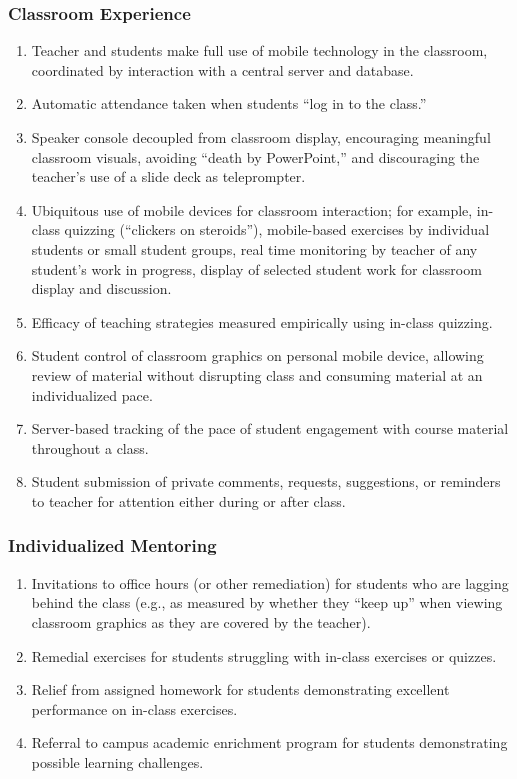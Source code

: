 \documentclass{article}
\begin{document}
\subsubsection{Classroom Experience}
\begin{enumerate}
\item Teacher and students make full use of mobile technology in the classroom,
  coordinated by interaction with a central server and database.
\item Automatic attendance taken when students ``log in to the class.''
\item Speaker console decoupled from classroom display,
  encouraging meaningful classroom visuals,
  avoiding ``death by PowerPoint,'' and
  discouraging the teacher's use of a slide deck as teleprompter.
\item Ubiquitous use of mobile devices for classroom interaction; for example,
  in-class quizzing (``clickers on steroids''),
  mobile-based exercises by individual students or small student groups,
  real time monitoring by teacher of any student's work in progress,
  display of selected student work for classroom display and discussion.
\item Efficacy of teaching strategies measured empirically using in-class quizzing.
\item Student control of classroom graphics on personal mobile device,
  allowing review of material without disrupting class and
  consuming material at an individualized pace.
\item Server-based tracking of the pace of student engagement with course material
  throughout a class.
\item Student submission of private comments, requests, suggestions, or reminders to
  teacher for attention either during or after class.
\end{enumerate}

\subsubsection{Individualized Mentoring}
\begin{enumerate}
\item Invitations to office hours (or other remediation) for students who are lagging
  behind the class (e.g., as measured by whether they ``keep up'' when viewing classroom
  graphics as they are covered by the teacher).
\item Remedial exercises for students struggling with in-class exercises or quizzes.
\item Relief from assigned homework for students demonstrating excellent performance on
  in-class exercises.
\item Referral to campus academic enrichment program for students demonstrating possible
  learning challenges.
\end{enumerate}
\end{document}
